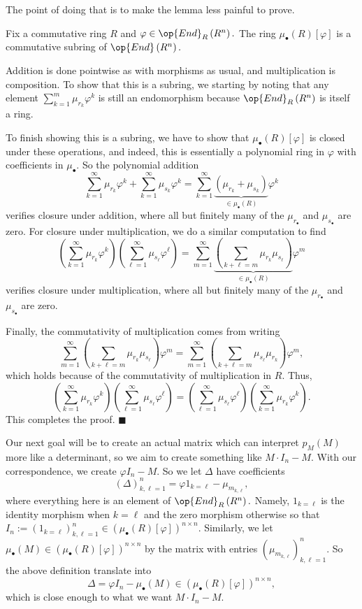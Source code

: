 The point of doing that is to make the lemma less painful to prove.
\begin{lemma}
    Fix a commutative ring $R$ and $\varphi\in\op{End}_R\left(R^n\right).$ The ring $\mu_\bullet(R)[\varphi]$ is a commutative subring of $\op{End}\left(R^n\right).$
\end{lemma}
Addition is done pointwise as with morphisms as usual, and multiplication is composition. To show that this is a subring, we starting by noting that any element $\sum_{k=1}^m\mu_{r_k}\varphi^k$ is still an endomorphism because $\op{End}_R\left(R^n\right)$ is itself a ring.

To finish showing this is a subring, we have to show that $\mu_\bullet(R)[\varphi]$ is closed under these operations, and indeed, this is essentially a polynomial ring in $\varphi$ with coefficients in $\mu_\bullet.$ So the polynomial addition
\[\sum_{k=1}^\infty\mu_{r_k}\varphi^k+\sum_{k=1}^\infty\mu_{s_k}\varphi^k=\sum_{k=1}^\infty\underbrace{(\mu_{r_k}+\mu_{s_k})}_{\in\mu_\bullet(R)}\varphi^k\]
verifies closure under addition, where all but finitely many of the $\mu_{r_\bullet}$ and $\mu_{s_\bullet}$ are zero. For closure under multiplication, we do a similar computation to find
\[\left(\sum_{k=1}^\infty\mu_{r_k}\varphi^k\right)\left(\sum_{\ell=1}^\infty\mu_{s_\ell}\varphi^\ell\right)=\sum_{m=1}^\infty\underbrace{\left(\sum_{k+\ell=m}\mu_{r_k}\mu_{s_\ell}\right)}_{\in\mu_\bullet(R)}\varphi^m\]
verifies closure under multiplication, where all but finitely many of the $\mu_{r_\bullet}$ and $\mu_{s_\bullet}$ are zero.

Finally, the commutativity of multiplication comes from writing
\[\sum_{m=1}^\infty\left(\sum_{k+\ell=m}\mu_{r_k}\mu_{s_\ell}\right)\varphi^m=\sum_{m=1}^\infty\left(\sum_{k+\ell=m}\mu_{s_\ell}\mu_{r_k}\right)\varphi^m,\]
which holds because of the commutativity of multiplication in $R.$ Thus,
\[\left(\sum_{k=1}^\infty\mu_{r_k}\varphi^k\right)\left(\sum_{\ell=1}^\infty\mu_{s_\ell}\varphi^\ell\right)=\left(\sum_{\ell=1}^\infty\mu_{s_\ell}\varphi^\ell\right)\left(\sum_{k=1}^\infty\mu_{r_k}\varphi^k\right).\]
This completes the proof. $\blacksquare$

Our next goal will be to create an actual matrix which can interpret $p_M(M)$ more like a determinant, so we aim to create something like $M\cdot I_n-M.$ With our correspondence, we create $\varphi I_n-M.$ So we let $\Delta$ have coefficients
\[(\Delta)_{k,\ell=1}^n=\varphi1_{k=\ell}-\mu_{m_{k,\ell}},\]
where everything here is an element of $\op{End}_R\left(R^n\right).$ Namely, $1_{k=\ell}$ is the identity morphism when $k=\ell$ and the zero morphism otherwise so that $I_n:=(1_{k=\ell})_{k,\ell=1}^n\in\left(\mu_\bullet(R)[\varphi]\right)^{n\times n}.$ Similarly, we let $\mu_\bullet(M)\in\left(\mu_\bullet(R)[\varphi]\right)^{n\times n}$ by the matrix with entries $(\mu_{m_{k,\ell}})_{k,\ell=1}^n.$ So the above definition translate into
\[\Delta=\varphi I_n-\mu_\bullet(M)\in\left(\mu_\bullet(R)[\varphi]\right)^{n\times n},\]
which is close enough to what we want $M\cdot I_n-M.$


